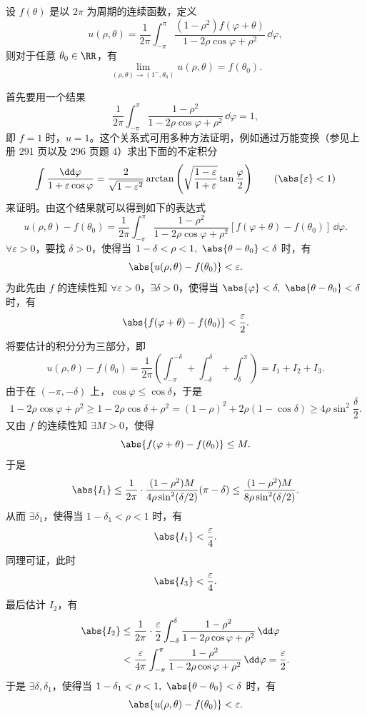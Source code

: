 \begin{xexample}[18.2.4]
设 $f(\theta)$ 是以 $2\pi$ 为周期的连续函数，定义
\[
  u(\rho,\theta)=\frac1{2\pi}\int_{-\pi}^{\pi}
  \frac{(1-\rho^2)f(\varphi+\theta)}{1-2\rho\cos\varphi+\rho^2}\,\dd\varphi,
\]
则对于任意 $\theta_0\in\RR$，有
\[
  \lim_{(\rho,\theta)\to(1^-,\theta_0)}u(\rho,\theta)=f(\theta_0).
\]
\end{xexample}
\begin{xproof}
首先要用一个结果
\[
  \frac1{2\pi}\int_{-\pi}^{\pi}\frac{1-\rho^2}{1-2\rho\cos\varphi+\rho^2}\,\dd\varphi=1,
\]
即 $f=1$ 时，$u=1$。这个关系式可用多种方法证明，例如通过万能变换（参见上册 291 页以及 296 页题 4）求出下面的不定积分
\[
  \int\frac{\dd\varphi}{1+\varepsilon\cos\varphi}
  =\frac{2}{\sqrt{1-\varepsilon^2}}
  \arctan\left(\sqrt{\frac{1-\varepsilon}{1+\varepsilon}}\tan\frac\varphi2\right)
  \qquad(\abs{\varepsilon}<1)
\]
来证明。由这个结果就可以得到如下的表达式
\[
  u(\rho,\theta)-f(\theta_0)
  =\frac1{2\pi}\int_{-\pi}^{\pi}
  \frac{1-\rho^2}{1-2\rho\cos\varphi+\rho^2}
  [f(\varphi+\theta)-f(\theta_0)]\,\dd\varphi.
\]
$\forall\varepsilon>0$，要找 $\delta>0$，使得当 $1-\delta<\rho<1,\ \abs{\theta-\theta_0}<\delta$ 时，有
\[
  \abs{u(\rho,\theta)-f(\theta_0)}<\varepsilon.
\]
为此先由 $f$ 的连续性知 $\forall\varepsilon>0$，$\exists\delta>0$，使得当 $\abs{\varphi}<\delta,\ \abs{\theta-\theta_0}<\delta$ 时，有
\[
  \abs{f(\varphi+\theta)-f(\theta_0)}<\frac\varepsilon2.
\]
将要估计的积分分为三部分，即
\[
  u(\rho,\theta)-f(\theta_0)
  =\frac1{2\pi}
  \left(\int_{-\pi}^{-\delta}+\int_{-\delta}^{\delta}+\int_{\delta}^{\pi}\right)
  =I_1+I_2+I_3.
\]
由于在 $(-\pi,-\delta)$ 上，$\cos\varphi\le\cos\delta$，于是
\[
  1-2\rho\cos\varphi+\rho^2
  \ge1-2\rho\cos\delta+\rho^2
  =(1-\rho)^2+2\rho(1-\cos\delta)
  \ge4\rho\sin^2\frac\delta2.
\]
又由 $f$ 的连续性知 $\exists M>0$，使得
\[
  \abs{f(\varphi+\theta)-f(\theta_0)}\le M.
\]
于是
\[
  \abs{I_1}
  \le\frac1{2\pi}\cdot\frac{(1-\rho^2)M}{4\rho\sin^2(\delta/2)}(\pi-\delta)
  \le\frac{(1-\rho^2)M}{8\rho\sin^2(\delta/2)}.
\]
从而 $\exists\delta_1$，使得当 $1-\delta_1<\rho<1$ 时，有
\[
  \abs{I_1}<\frac\varepsilon4.
\]
同理可证，此时
\[
  \abs{I_3}<\frac\varepsilon4.
\]
最后估计 $I_2$，有
\begin{align*}
  \abs{I_2}
  &\le\frac1{2\pi}\cdot\frac\varepsilon2
  \int_{-\delta}^{\delta}
  \frac{1-\rho^2}{1-2\rho\cos\varphi+\rho^2}\,\dd\varphi\\
  &<\frac\varepsilon{4\pi}\int_{-\pi}^{\pi}
  \frac{1-\rho^2}{1-2\rho\cos\varphi+\rho^2}\,\dd\varphi
  =\frac\varepsilon2.
\end{align*}
于是 $\exists\delta,\delta_1$，使得当 $1-\delta_1<\rho<1,\ \abs{\theta-\theta_0}<\delta$ 时，有
\[
  \abs{u(\rho,\theta)-f(\theta_0)}<\varepsilon.
\]
\end{xproof}

